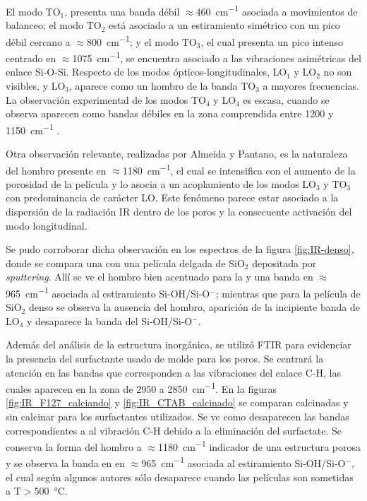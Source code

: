		 El modo TO$_1$, presenta una banda débil $\approx$\SI{460}{\cm^{-1}} asociada a movimientos de balanceo; el modo TO$_2$ está asociado a un estiramiento simétrico con un pico débil cercano a $\approx$\SI{800}{\cm^{-1}}; y el modo TO$_3$, el cual presenta un pico intenso centrado en $\approx$\SI{1075}{\cm^{-1}}, se encuentra asociado a las vibraciones asimétricas del enlace Si-O-Si. Respecto de los modos ópticos-longitudinales, LO$_1$ y LO$_2$ no son visibles, y LO$_3$, aparece como un hombro de la banda TO$_3$ a mayores frecuencias. La observación experimental de los modos TO$_4$ y LO$_4$ es escasa, cuando se observa aparecen como bandas débiles en la zona comprendida entre 1200 y \SI{1150}{\cm^{-1}} \cite{Pai1986,Grosse1986}.
				 	
		 Otra observación relevante, realizadas por Almeida y Pantano\cite{Almeida1990}, es la naturaleza del hombro presente en $\approx$\SI{1180}{\cm^{-1}}, el cual se intensifica con el aumento de la porosidad de la película y lo asocia a un acoplamiento de los modos LO$_3$ y TO$_3$ con predominancia de carácter LO. Este fenómeno parece estar asociado a la dispersión de la radiación IR dentro de los poros y la consecuente activación del modo longitudinal.	
			
		 Se pudo corroborar dicha observación en los espectros de la figura \ref{fig:IR-denso}, donde se compara una \pdm\space con una película delgada de SiO$_2$ depositada por \textit{sputtering}.  Allí se ve el hombro bien acentuado para la \pdm\space y una banda en $\approx$\SI{965}{\cm^{-1}} asociada al estiramiento Si-OH/Si-O$^-$; mientras que para la película de SiO$_2$ denso se observa la ausencia del hombro, aparición de la incipiente banda de LO$_4$ y desaparece la banda del Si-OH/Si-O$^-$.

		 Además del análisis de la estructura inorgánica, se utilizó FTIR para evidenciar la presencia del surfactante usado de molde para los poros. Se centrará la atención en las bandas que corresponden a las vibraciones del enlace C-H, las cuales aparecen en la zona de 2950 a \SI{2850}{\cm^{-1}}. En la figuras \ref{fig:IR_F127_calciando} y \ref{fig:IR_CTAB_calcinado} se comparan \pdm\space calcinadas y sin calcinar para los surfactantes utilizados. Se ve como desaparecen las bandas correspondientes a al vibración C-H debido a la eliminación del surfactate. Se conserva la forma del hombro a $\approx$\SI{1180}{\cm^{-1}} indicador de una estructura porosa y se observa la banda en en $\approx$\SI{965}{\cm^{-1}} asociada al estiramiento Si-OH/Si-O$^-$, el cual según algunos autores sólo desaparece cuando las películas son sometidas a T$>$\SI{500}{\celsius}.\cite{Innocenzi2003,Almeida1990,Bertoluzza1982}

